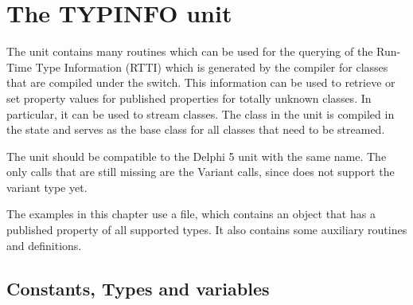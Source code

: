 %
%
%
%
%
\chapter{The TYPINFO unit}
The  unit contains many routines which can be used for
the querying of the Run-Time Type Information (RTTI) which is generated
by the compiler for classes that are compiled under the 
switch. This information can be used to retrieve or set property values
for published properties for totally unknown classes. In particular, it
can be used to stream classes. The  class in the 
 unit is compiled in the  state and serves
as the base class for all classes that need to be streamed.

The unit should be compatible to the Delphi 5 unit with the same name. 
The only calls that are still missing are the Variant calls, since \fpc
does not support the variant type yet.

The examples in this chapter use a  file, which contains
an object that has a published property of all supported types. It also
contains some auxiliary routines and definitions.
\section{Constants, Types and variables}
